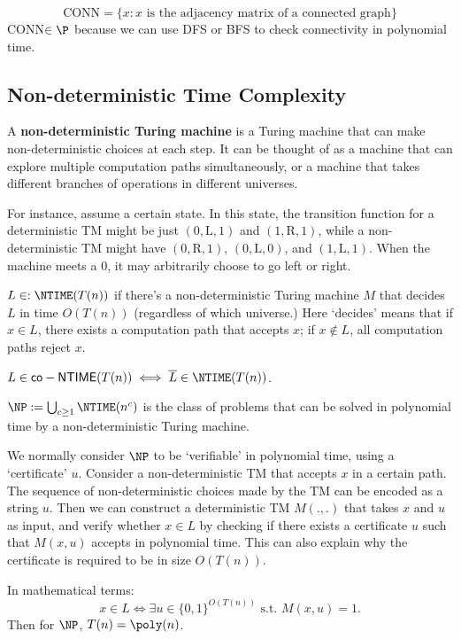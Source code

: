 
\begin{eg}
	\[ \text{CONN} = \{ x: x \text{ is the adjacency matrix of a connected graph} \} \]
  CONN$\in \P$ because we can use DFS or BFS to check connectivity in polynomial time.
\end{eg}

\subsection{Non-deterministic Time Complexity}

\begin{definition}
	A \textbf{non-deterministic Turing machine} is a Turing machine that can make non-deterministic choices at each step. It can be thought of as a machine that can explore multiple computation paths simultaneously, or a machine that takes different branches of operations in different universes.
\end{definition}

For instance, assume a certain state. In this state, the transition function for a deterministic TM might be just $(0,\text{L},1)$ and $(1,\text{R},1)$, while a non-deterministic TM might have $(0,\text{R},1)$, $(0,\text{L},0)$, and $(1,\text{L},1)$. When the machine meets a $0$, it may arbitrarily choose to go left or right.

\begin{definition}
	$L \in : \NTIME(T(n))$ if there's a non-deterministic Turing machine $M$ that decides $L$ in time $O(T(n))$ (regardless of which universe.)
	Here `decides' means that if $x\in L$, there exists a computation path that accepts $x$; if $x\notin L$, all computation paths reject $x$.

\end{definition}
\begin{definition}

	$L \in \mathsf{co-NTIME}(T(n)) \iff \overline{L} \in \NTIME(T(n))$.
\end{definition}
\begin{definition}
	$ \NP := \bigcup_{c\ge 1} \NTIME(n^c)$ is the class of problems that can be solved in polynomial time by a non-deterministic Turing machine.
\end{definition}

\begin{remark}
	We normally consider $\NP$ to be `verifiable' in polynomial time, using a `certificate' $u$. Consider a non-deterministic TM that accepts $x$ in a certain path. The sequence of non-deterministic choices made by the TM can be encoded as a string $u$. Then we can construct a deterministic TM $M(.,.)$ that takes $x$ and $u$ as input, and verify whether $x\in L$ by checking if there exists a certificate $u$ such that $M(x,u)$ accepts in polynomial time. This can also explain why the certificate is required to be in size $O(T(n))$.

	In mathematical terms:
	\[ x\in L \iff \exists u\in \{0,1\}^{O(T(n))} \text{ s.t. } M(x,u) = 1. \]
	Then for $\NP$, $T(n) = \poly(n)$.
\end{remark}

